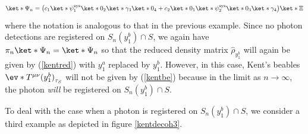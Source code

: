 \documentclass[12pt]{report}
\begin{document}
 \begin{equation*}
 \ket*{\Psi_n}=\big(c_1\ket*{\psi_1^\text{sys}}\ket*{0_2}\ket*{\gamma_3}\ket*{0_4}+c_2\ket*{0_1}\ket*{\psi_2^\text{sys}}\ket*{0_3}\ket*{\gamma_4}\big)\ket*{\Xi}
 \end{equation*}
 where the notation is analogous to that in the previous example. Since no photon detections are registered on $S_n(y^b_1)\cap S$, we again have $\pi_n\ket*{\Psi_n}=\ket*{\Psi_n}$ so that the reduced density matrix $\hat{\rho}_{y_1^b}$ will again be given by  (\ref{kentred}) with $y^a_1$ replaced by $y^b_1$. However, in this case, Kent's beables $\ev*{T^{\mu\nu}(y^b_1)}_{\tau_S}$ will not be given by (\ref{kentbe}) because in the limit as $n\rightarrow\infty$, the photon \emph{will} be registered on $S_n(y^b_1)\cap S$. 

 To deal with the case when a photon is registered on $S_n(y^b_1)\cap S$, we consider a third example as depicted in figure \ref{kentdecoh3}.
\end{document}
